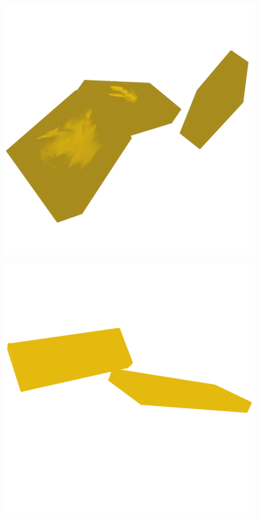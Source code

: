 \documentclass[12pt]{article}
\begin{document}
	\includegraphics[scale=0.1]{platforms.png}
	
	\includegraphics[scale=0.1]{platformsTwo.png}
	
\end{document}
